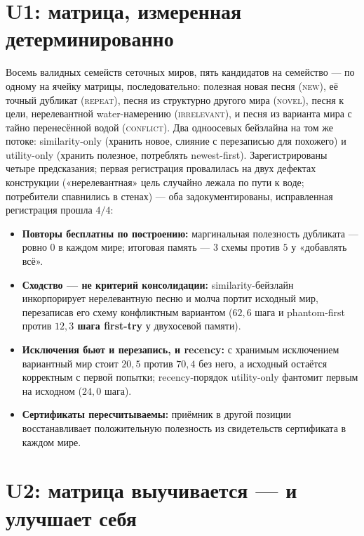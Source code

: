 \documentclass{article}
\begin{document}
\section{U1: матрица, измеренная детерминированно}
\label{p5:sec:u1}

Восемь валидных семейств сеточных миров, пять кандидатов на семейство
--- по одному на ячейку матрицы, последовательно: полезная новая
песня (\textsc{new}), её точный дубликат (\textsc{repeat}), песня из
структурно другого мира (\textsc{novel}), песня к цели, нерелевантной
water-намерению (\textsc{irrelevant}), и песня из варианта мира с
тайно перенесённой водой (\textsc{conflict}). Два одноосевых
бейзлайна на том же потоке: similarity-only (хранить новое, слияние с
перезаписью для похожего) и utility-only (хранить полезное,
потреблять newest-first). Зарегистрированы четыре предсказания;
первая регистрация провалилась на двух дефектах конструкции
(«нерелевантная» цель случайно лежала по пути к воде; потребители
спавнились в стенах) --- оба задокументированы, исправленная
регистрация прошла $4/4$:

\begin{itemize}[leftmargin=16pt,itemsep=2pt,topsep=2pt]
\item \textbf{Повторы бесплатны по построению:} маргинальная
  полезность дубликата --- ровно $0$ в каждом мире; итоговая память
  --- $3$ схемы против $5$ у «добавлять всё».
\item \textbf{Сходство --- не критерий консолидации:}
  similarity-бейзлайн инкорпорирует нерелевантную песню и молча
  портит исходный мир, перезаписав его схему конфликтным вариантом
  ($62{,}6$ шага и phantom-first против \textbf{$12{,}3$ шага
  first-try} у двухосевой памяти).
\item \textbf{Исключения бьют и перезапись, и recency:} с хранимым
  исключением вариантный мир стоит $20{,}5$ против $70{,}4$ без него,
  а исходный остаётся корректным с первой попытки; recency-порядок
  utility-only фантомит первым на исходном ($24{,}0$ шага).
\item \textbf{Сертификаты пересчитываемы:} приёмник в другой позиции
  восстанавливает положительную полезность из свидетельств
  сертификата в каждом мире.
\end{itemize}

\section{U2: матрица выучивается --- и улучшает себя}
\label{p5:sec:u2}
\end{document}
